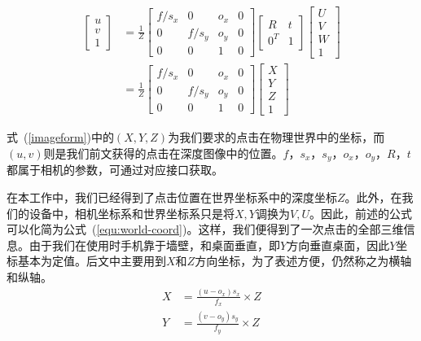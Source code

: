 \begin{equation}
    \label{imageform}
    \begin{aligned}
    \begin{bmatrix}
        u \\
        v \\
        1
    \end{bmatrix}
    &= \frac{1}{Z} \begin{bmatrix}
        f / s_x & 0 & o_x & 0\\
        0 & f / s_y & o_y & 0 \\
        0 & 0 & 1 & 0
      \end{bmatrix}
      \begin{bmatrix}
        R & t \\
        0^{T} & 1
      \end{bmatrix}
      \begin{bmatrix}
        U \\
        V \\
        W \\
        1
      \end{bmatrix} \\
    &= \frac{1}{Z} \begin{bmatrix}
        f / s_x & 0 & o_x & 0\\
        0 & f / s_y & o_y & 0 \\
        0 & 0 & 1 & 0
      \end{bmatrix}
      \begin{bmatrix}
        X \\
        Y \\
        Z \\
        1
      \end{bmatrix}
    \end{aligned}
\end{equation}

式~(\ref{imageform})中的$(X, Y, Z)$为我们要求的点击在物理世界中的坐标，而$(u, v)$则是我们前文获得的点击在深度图像中的位置。$f$，$s_x$，$s_y$，$o_x$，$o_y$，$R$，$t$都属于相机的参数，可通过对应接口获取。

在本工作中，我们已经得到了点击位置在世界坐标系中的深度坐标$Z$。此外，在我们的设备中，相机坐标系和世界坐标系只是将$X, Y$调换为$V, U$。因此，前述的公式可以化简为公式~(\ref{equ:world-coord})。这样，我们便得到了一次点击的全部三维信息。由于我们在使用时手机靠于墙壁，和桌面垂直，即$Y$方向垂直桌面，因此$Y$坐标基本为定值。后文中主要用到$X$和$Z$方向坐标，为了表述方便，仍然称之为横轴和纵轴。
\begin{equation}
  \begin{aligned}
  X &= \frac{(u - o_x)s_x}{f_x} \times Z \\
  Y &= \frac{(v - o_y)s_y}{f_y} \times Z
  \end{aligned}
  \label{equ:world-coord}
\end{equation}

